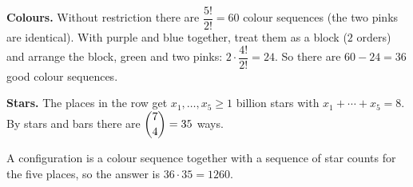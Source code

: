 \textbf{Colours.} Without restriction there are $\dfrac{5!}{2!}=60$ colour sequences (the two pinks are identical). With purple and blue together, treat them as a block ($2$ orders) and arrange the block, green and two pinks: $2\cdot\dfrac{4!}{2!}=24$. So there are $60-24=36$ good colour sequences.

\textbf{Stars.} The places in the row get $x_1,\dots,x_5\ge1$ billion stars with $x_1+\cdots+x_5=8$. By stars and bars there are $\dbinom{7}{4}=35$ ways.

A configuration is a colour sequence together with a sequence of star counts for the five places, so the answer is $36\cdot35=\boxed{1260}$.
